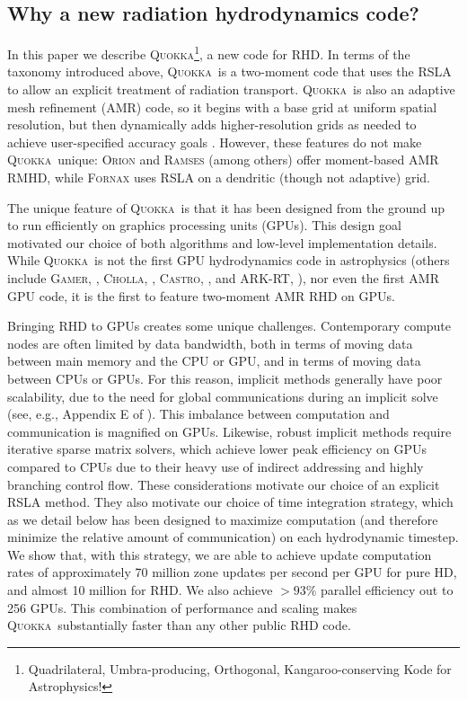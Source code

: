 \documentclass[fleqn,usenatbib]{mnras}
\newcommand{\quokka}{\textsc{Quokka}}
\begin{document}
\subsection{Why a new radiation hydrodynamics code?}

In this paper we describe \quokka\footnote{Quadrilateral, Umbra-producing, Orthogonal, Kangaroo-conserving Kode for Astrophysics!}, a new code for RHD. In terms of the taxonomy introduced above, \quokka~is a two-moment code that uses the RSLA to allow an explicit treatment of radiation transport. \quokka~is also an adaptive mesh refinement (AMR) code, so it begins with a base grid at uniform spatial resolution, but then dynamically adds higher-resolution grids as needed to achieve user-specified accuracy goals \citep{Berger:1984, Berger:1989}. However, these features do not make \quokka~unique: \textsc{Orion} and \textsc{Ramses} (among others) offer moment-based AMR RMHD, while \textsc{Fornax} uses RSLA on a dendritic (though not adaptive) grid.

The unique feature of \quokka~is that it has been designed from the ground up to run efficiently on graphics processing units (GPUs). This design goal motivated our choice of both algorithms and low-level implementation details. While \quokka~is not the first GPU hydrodynamics code in astrophysics (others include \textsc{Gamer}, \citealt{Schive10a, Schive18a}, \textsc{Cholla}, \citealt{Schneider15a}, \textsc{Castro}, \citealt{Almgren_2020}, and \textsc{ARK-RT}, \citealt{Bloch_2021}), nor even the first AMR GPU code, it is the first to feature two-moment AMR RHD on GPUs.

Bringing RHD to GPUs creates some unique challenges. Contemporary compute nodes are often limited by data bandwidth, both in terms of moving data between main memory and the CPU or GPU, and in terms of moving data between CPUs or GPUs. For this reason, implicit methods generally have poor scalability, due to the need for global communications during an implicit solve (see, e.g., Appendix E of \citealt{Skinner_2019}). This imbalance between computation and communication is magnified on GPUs. Likewise, robust implicit methods require iterative sparse matrix solvers, which achieve lower peak efficiency on GPUs compared to CPUs due to their heavy use of indirect addressing and highly branching control flow. These considerations motivate our choice of an explicit RSLA method. They also motivate our choice of time integration strategy, which as we detail below has been designed to maximize computation (and therefore minimize the relative amount of communication) on each hydrodynamic timestep. We show that, with this strategy, we are able to achieve update computation rates of approximately 70 million zone updates per second per GPU for pure HD, and almost 10 million for RHD. We also achieve $>93\%$ parallel efficiency out to 256 GPUs. This combination of performance and scaling makes \quokka~substantially faster than any other public RHD code.
\end{document}
